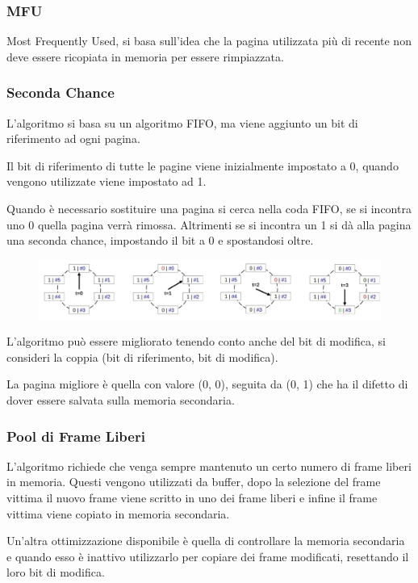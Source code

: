 \subsubsection{MFU}
Most Frequently Used, si basa sull'idea che la pagina utilizzata più di recente non deve essere ricopiata in memoria per essere rimpiazzata.

\subsubsection{Seconda Chance}
L'algoritmo si basa su un algoritmo FIFO, ma viene aggiunto un bit di riferimento ad ogni pagina.

Il bit di riferimento di tutte le pagine viene inizialmente impostato a 0, quando vengono utilizzate viene impostato ad 1.

\spacer
Quando è necessario sostituire una pagina si cerca nella coda FIFO, se si incontra uno 0 quella pagina verrà rimossa. Altrimenti se si incontra un 1 si dà alla pagina una seconda chance, impostando il bit a 0 e spostandosi oltre.

\begin{figure}[H]
    \centering
    \includegraphics[width=0.9\linewidth]{assets/algoritmo-seconda-chance.jpg}
\end{figure}

L'algoritmo può essere migliorato tenendo conto anche del bit di modifica, si consideri la coppia (bit di riferimento, bit di modifica).

La pagina migliore è quella con valore (0, 0), seguita da (0, 1) che ha il difetto di dover essere salvata sulla memoria secondaria.

\subsubsection{Pool di Frame Liberi}
L'algoritmo richiede che venga sempre mantenuto un certo numero di frame liberi in memoria. Questi vengono utilizzati da buffer, dopo la selezione del frame vittima il nuovo frame viene scritto in uno dei frame liberi e infine il frame vittima viene copiato in memoria secondaria.

\spacer
Un'altra ottimizzazione disponibile è quella di controllare la memoria secondaria e quando esso è inattivo utilizzarlo per copiare dei frame modificati, resettando il loro bit di modifica.

